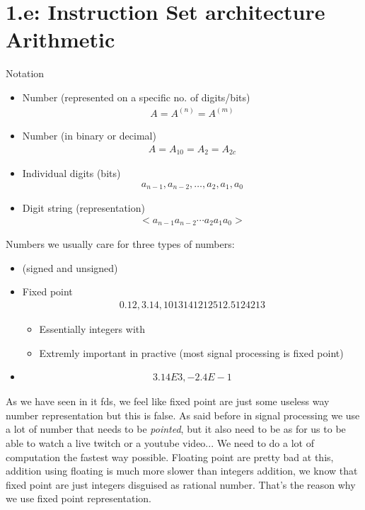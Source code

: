 \section{1.e: Instruction Set architecture Arithmetic}
\begin{parag}{Notation}
    \begin{itemize}
        \item Number (represented on a specific no. of digits/bits)
			\begin{align*} A =  A^{\left(n\right)}  =  A^{\left(m\right)}\end{align*}
		\item  Number (in binary or decimal)
			\begin{align*} A = A_{10} =  A_2 = A_{2c} \end{align*}
			\item Individual digits (bits)
				\begin{align*} a_{n-1}, a_{n-2}, \ldots, a_2, a_1, a_0 \end{align*}
				\item Digit string (representation)
					\begin{align*} <a_{n-1}a_{n-2}\cdots a_2 a_1 a_0> \end{align*}
    \end{itemize}
\end{parag}
\begin{parag}{Numbers}
    we usually care for three types of numbers:
	\begin{itemize}
	    \item {} (signed and unsigned)
		\item Fixed point
			\begin{align*} 0.12, 3.14, 1013141212512.5124213 \end{align*}
			\begin{itemize}
			    \item Essentially integers with 
			    \item Extremly important in practive (most signal processing is fixed point)
			\end{itemize}
		\item {}	
			\begin{align*} 3.14E3, -2.4E-1 \end{align*}
	\end{itemize}
	\begin{framedremark}
	As we have seen in it fds, we feel like fixed point are just some useless way number representation but this is false. As said before in signal processing we use a lot of number that needs to be \textit{pointed}, but it also need to be  as for us to be able to watch a live twitch or a youtube video... We need to do a lot of computation the fastest way possible. Floating point are pretty bad at this, addition using floating is much more slower than integers addition, we know that fixed point are just integers disguised as rational number. That's the reason why we use fixed point representation.
	\end{framedremark}
\end{parag}
